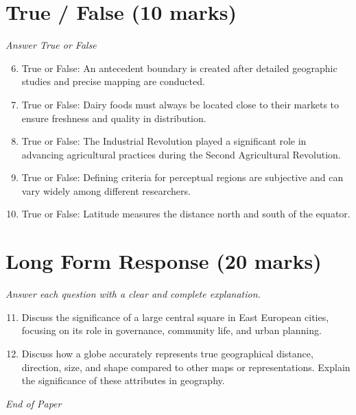 \documentclass[12pt]{article}
\begin{document}
\section*{True / False (10 marks)}
\textit{Answer True or False}
\begin{enumerate}[label=\arabic*.]
\setcounter{enumi}{5}
\item True or False: An antecedent boundary is created after detailed geographic studies and precise mapping are conducted.
\item True or False: Dairy foods must always be located close to their markets to ensure freshness and quality in distribution.
\item True or False: The Industrial Revolution played a significant role in advancing agricultural practices during the Second Agricultural Revolution.
\item True or False: Defining criteria for perceptual regions are subjective and can vary widely among different researchers.
\item True or False: Latitude measures the distance north and south of the equator.
\end{enumerate}

\section*{Long Form Response (20 marks)}
\textit{Answer each question with a clear and complete explanation.}
\begin{enumerate}[label=\arabic*.]
\setcounter{enumi}{10}
\item Discuss the significance of a large central square in East European cities, focusing on
its role in governance, community life, and urban planning.
\item Discuss how a globe accurately represents true geographical distance, direction, size, and
shape compared to other maps or representations. Explain the significance of these
attributes in geography.
\end{enumerate}

\vfill
\noindent\textit{End of Paper}
\end{document}
